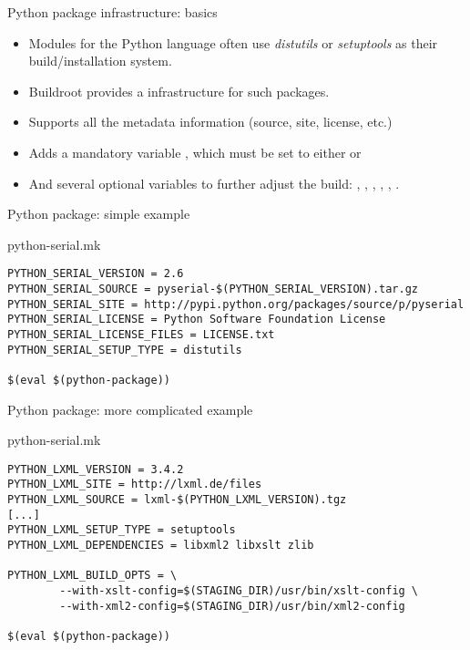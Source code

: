 \begin{frame}{Python package infrastructure: basics}
  \begin{itemize}
  \item Modules for the Python language often use {\em distutils} or
    {\em setuptools} as their build/installation system.
  \item Buildroot provides a  infrastructure for
    such packages.
  \item Supports all the  metadata information
    (source, site, license, etc.)
  \item Adds a mandatory variable , which must
    be set to either  or 
  \item And several optional variables to further adjust the build:
    , ,
    ,
    , ,
    .
  \end{itemize}
\end{frame}

\begin{frame}[fragile]{Python package: simple example}

  \begin{block}{python-serial.mk}
    \begin{verbatim}
PYTHON_SERIAL_VERSION = 2.6
PYTHON_SERIAL_SOURCE = pyserial-$(PYTHON_SERIAL_VERSION).tar.gz
PYTHON_SERIAL_SITE = http://pypi.python.org/packages/source/p/pyserial
PYTHON_SERIAL_LICENSE = Python Software Foundation License
PYTHON_SERIAL_LICENSE_FILES = LICENSE.txt
PYTHON_SERIAL_SETUP_TYPE = distutils

$(eval $(python-package))
    \end{verbatim}
  \end{block}

\end{frame}

\begin{frame}[fragile]{Python package: more complicated example}
  \begin{block}{python-serial.mk}
    \begin{verbatim}
PYTHON_LXML_VERSION = 3.4.2
PYTHON_LXML_SITE = http://lxml.de/files
PYTHON_LXML_SOURCE = lxml-$(PYTHON_LXML_VERSION).tgz
[...]
PYTHON_LXML_SETUP_TYPE = setuptools
PYTHON_LXML_DEPENDENCIES = libxml2 libxslt zlib

PYTHON_LXML_BUILD_OPTS = \
        --with-xslt-config=$(STAGING_DIR)/usr/bin/xslt-config \
        --with-xml2-config=$(STAGING_DIR)/usr/bin/xml2-config

$(eval $(python-package))
    \end{verbatim}
  \end{block}
\end{frame}

